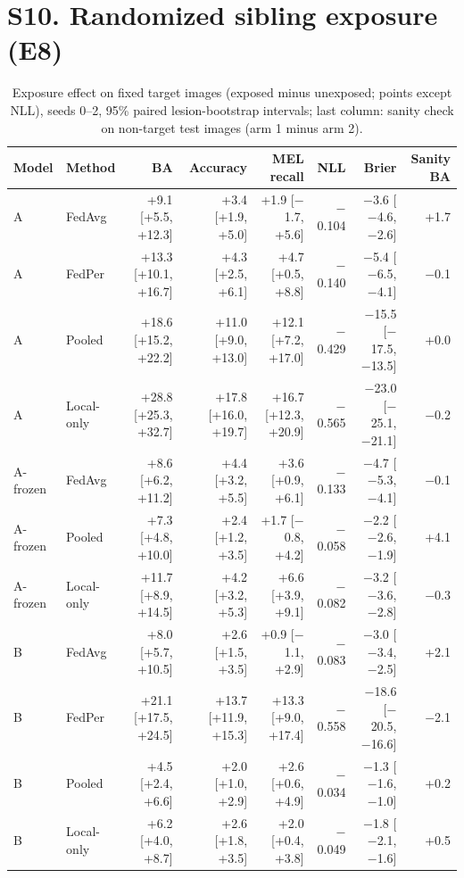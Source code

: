 \documentclass[10pt]{article}
\begin{document}
\section*{S10. Randomized sibling exposure (E8)}
\begin{table}[!htbp]
\centering
\scriptsize
\caption{Exposure effect on fixed target images (exposed minus unexposed; points except NLL), seeds 0--2, 95\% paired lesion-bootstrap intervals; last column: sanity check on non-target test images (arm 1 minus arm 2).}
\label{tab:s11}
\begin{tabular}{@{}llrrrrrr@{}}
\toprule
Model & Method & BA & Accuracy & MEL recall & NLL & Brier & Sanity BA \\
\midrule
A & FedAvg & +9.1 [+5.5, +12.3] & +3.4 [+1.9, +5.0] & +1.9 [$-$1.7, +5.6] & $-$0.104 & $-$3.6 [$-$4.6, $-$2.6] & +1.7 \\
A & FedPer & +13.3 [+10.1, +16.7] & +4.3 [+2.5, +6.1] & +4.7 [+0.5, +8.8] & $-$0.140 & $-$5.4 [$-$6.5, $-$4.1] & $-$0.1 \\
A & Pooled & +18.6 [+15.2, +22.2] & +11.0 [+9.0, +13.0] & +12.1 [+7.2, +17.0] & $-$0.429 & $-$15.5 [$-$17.5, $-$13.5] & +0.0 \\
A & Local-only & +28.8 [+25.3, +32.7] & +17.8 [+16.0, +19.7] & +16.7 [+12.3, +20.9] & $-$0.565 & $-$23.0 [$-$25.1, $-$21.1] & $-$0.2 \\
A-frozen & FedAvg & +8.6 [+6.2, +11.2] & +4.4 [+3.2, +5.5] & +3.6 [+0.9, +6.1] & $-$0.133 & $-$4.7 [$-$5.3, $-$4.1] & $-$0.1 \\
A-frozen & Pooled & +7.3 [+4.8, +10.0] & +2.4 [+1.2, +3.5] & +1.7 [$-$0.8, +4.2] & $-$0.058 & $-$2.2 [$-$2.6, $-$1.9] & +4.1 \\
A-frozen & Local-only & +11.7 [+8.9, +14.5] & +4.2 [+3.2, +5.3] & +6.6 [+3.9, +9.1] & $-$0.082 & $-$3.2 [$-$3.6, $-$2.8] & $-$0.3 \\
B & FedAvg & +8.0 [+5.7, +10.5] & +2.6 [+1.5, +3.5] & +0.9 [$-$1.1, +2.9] & $-$0.083 & $-$3.0 [$-$3.4, $-$2.5] & +2.1 \\
B & FedPer & +21.1 [+17.5, +24.5] & +13.7 [+11.9, +15.3] & +13.3 [+9.0, +17.4] & $-$0.558 & $-$18.6 [$-$20.5, $-$16.6] & $-$2.1 \\
B & Pooled & +4.5 [+2.4, +6.6] & +2.0 [+1.0, +2.9] & +2.6 [+0.6, +4.9] & $-$0.034 & $-$1.3 [$-$1.6, $-$1.0] & +0.2 \\
B & Local-only & +6.2 [+4.0, +8.7] & +2.6 [+1.8, +3.5] & +2.0 [+0.4, +3.8] & $-$0.049 & $-$1.8 [$-$2.1, $-$1.6] & +0.5 \\
\bottomrule
\end{tabular}
\end{table}
\end{document}
